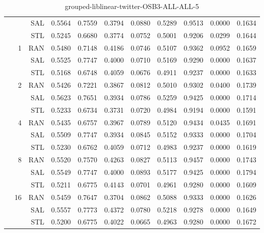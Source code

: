 \begin{center}
\begin{table}[htbp]
\begin{center}
\begin{tabular}{ | r | r | r | r | r | r | r | r | r | r | r |}
 &   & SAL & 0.5564 & 0.7559 & 0.3794 & 0.0880 & 0.5289 & 0.9513 & 0.0000 & 0.1634\\ \cline{3-11}
 &   & STL & 0.5245 & 0.6680 & 0.3774 & 0.0752 & 0.5001 & 0.9206 & 0.0299 & 0.1644\\ \cline{2-11}
 & \multirow{3}{*}{1} & RAN & 0.5480 & 0.7148 & 0.4186 & 0.0746 & 0.5107 & 0.9362 & 0.0952 & 0.1659\\ \cline{3-11}
 &   & SAL & 0.5525 & 0.7747 & 0.4000 & 0.0710 & 0.5169 & 0.9290 & 0.0000 & 0.1637\\ \cline{3-11}
 &   & STL & 0.5168 & 0.6748 & 0.4059 & 0.0676 & 0.4911 & 0.9237 & 0.0000 & 0.1633\\ \cline{2-11}
 & \multirow{3}{*}{2} & RAN & 0.5426 & 0.7221 & 0.3867 & 0.0812 & 0.5010 & 0.9302 & 0.0400 & 0.1739\\ \cline{3-11}
 &   & SAL & 0.5623 & 0.7651 & 0.3934 & 0.0786 & 0.5259 & 0.9425 & 0.0000 & 0.1714\\ \cline{3-11}
 &   & STL & 0.5233 & 0.6734 & 0.3731 & 0.0720 & 0.4984 & 0.9194 & 0.0000 & 0.1591\\ \cline{2-11}
 & \multirow{3}{*}{4} & RAN & 0.5435 & 0.6757 & 0.3967 & 0.0789 & 0.5120 & 0.9434 & 0.0435 & 0.1691\\ \cline{3-11}
 &   & SAL & 0.5509 & 0.7747 & 0.3934 & 0.0845 & 0.5152 & 0.9333 & 0.0000 & 0.1704\\ \cline{3-11}
 &   & STL & 0.5230 & 0.6762 & 0.4059 & 0.0712 & 0.4983 & 0.9237 & 0.0000 & 0.1619\\ \cline{2-11}
 & \multirow{3}{*}{8} & RAN & 0.5520 & 0.7570 & 0.4263 & 0.0827 & 0.5113 & 0.9457 & 0.0000 & 0.1743\\ \cline{3-11}
 &   & SAL & 0.5549 & 0.7747 & 0.4000 & 0.0893 & 0.5177 & 0.9425 & 0.0000 & 0.1794\\ \cline{3-11}
 &   & STL & 0.5211 & 0.6775 & 0.4143 & 0.0701 & 0.4961 & 0.9280 & 0.0000 & 0.1609\\ \cline{2-11}
 & \multirow{3}{*}{16} & RAN & 0.5459 & 0.7647 & 0.3704 & 0.0862 & 0.5088 & 0.9333 & 0.0000 & 0.1626\\ \cline{3-11}
 &   & SAL & 0.5557 & 0.7773 & 0.4372 & 0.0780 & 0.5218 & 0.9278 & 0.0000 & 0.1649\\ \cline{3-11}
 &   & STL & 0.5200 & 0.6775 & 0.4022 & 0.0665 & 0.4963 & 0.9280 & 0.0000 & 0.1672\\ \cline{2-11}
\hline
\end{tabular}
\caption{grouped-liblinear-twitter-OSB3-ALL-ALL-5}
\end{center}
 \end{table}
\end{center}

